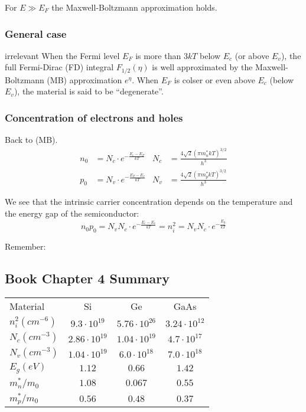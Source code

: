 \documentclass[a4paper, fontsize=8pt, landscape, DIV=1]{scrartcl}
\newcommand{\makeultracompact}{irrelevant}
\begin{document}
\begin{multicols*}{4}
  For $E \gg E_F$ the Maxwell-Boltzmann approximation holds.

  \subsubsection{General case}
  \ifdefined\makeultracompact\else
    When the Fermi level $E_F$ is more than $3kT$ below $E_c$ (or above $E_v$), the full Fermi-Dirac (FD) integral $F_{1/2}(\eta)$ is well approximated by the Maxwell-Boltzmann (MB) approximation $e^\eta$.
    When $E_F$ is colser or even above $E_c$ (below $E_v$), the material is said to be ``degenerate''.
  \fi

  \subsubsection{Concentration of electrons and holes}
  Back to (MB).
  \begin{align*}
    n_0 &= N_c \cdot e^{-\frac{E_c-E_F}{kT}} & N_c &= \frac{4\sqrt{2}(\pi m^*_n kT)^{3/2}}{h^3} \\
    p_0 &= N_v \cdot e^{-\frac{E_F-E_v}{kT}} & N_v &= \frac{4\sqrt{2}(\pi m^*_p kT)^{3/2}}{h^3} 
  \end{align*}

  We see that the intrinsic carrier concentration depends on the temperature and the energy gap of the semiconductor:
  \[n_0 p_0 = N_v N_c \cdot e^{-\frac{E_c-E_v}{kT}} = n_i^2 = N_vN_c\cdot e^{-\frac{E_g}{kT}}\]

  Remember: 
  
  \subsection{Book Chapter 4 Summary}

      \begin{tabular}[h]{l c c c}
        Material & Si & Ge & GaAs \\
        $n_i^2(cm^{-6})$  & $9.3\cdot 10^{19}$  & $5.76\cdot 10^{26}$ & $3.24\cdot 10^{12}$ \\
        $N_c(cm^{-3})$    & $2.86\cdot 10^{19}$ & $1.04\cdot 10^{19}$ & $4.7\cdot 10^{17}$ \\

        $N_v(cm^{-3})$    & $1.04\cdot 10^{19}$ & $6.0\cdot 10^{18}$  & $7.0\cdot 10^{18}$ \\
        $E_g (eV)$        & $1.12$ & $0.66$ & $1.42$ \\
        $m_n^*/m_0$       & $1.08$ & $0.067$ & $0.55$\\
        $m_p^*/m_0$       & $0.56$ & $0.48$ & $0.37$\\
      \end{tabular}


\end{multicols*}
\end{document}
